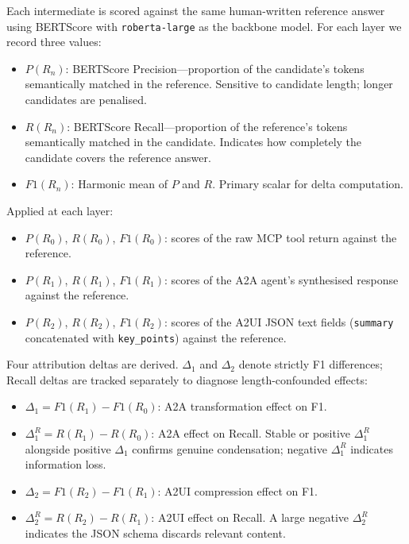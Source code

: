 \documentclass[10pt,journal,compsoc]{IEEEtran}
\begin{document}
Each intermediate is scored against the same human-written reference answer using
BERTScore with \texttt{roberta-large} as the backbone model. For each layer we
record three values:

\begin{itemize}
  \item $P(R_n)$: BERTScore Precision---proportion of the candidate's tokens
    semantically matched in the reference. Sensitive to candidate length; longer
    candidates are penalised.
  \item $R(R_n)$: BERTScore Recall---proportion of the reference's tokens
    semantically matched in the candidate. Indicates how completely the candidate
    covers the reference answer.
  \item $F1(R_n)$: Harmonic mean of $P$ and $R$. Primary scalar for delta
    computation.
\end{itemize}

Applied at each layer:

\begin{itemize}
  \item $P(R_0)$, $R(R_0)$, $F1(R_0)$: scores of the raw MCP tool return against
    the reference.
  \item $P(R_1)$, $R(R_1)$, $F1(R_1)$: scores of the A2A agent's synthesised
    response against the reference.
  \item $P(R_2)$, $R(R_2)$, $F1(R_2)$: scores of the A2UI JSON text fields
    (\texttt{summary} concatenated with \texttt{key\_points}) against the
    reference.
\end{itemize}

Four attribution deltas are derived. $\Delta_1$ and $\Delta_2$ denote strictly F1
differences; Recall deltas are tracked separately to diagnose length-confounded
effects:

\begin{itemize}
  \item $\Delta_1 = F1(R_1) - F1(R_0)$: A2A transformation effect on F1.
  \item $\Delta_1^R = R(R_1) - R(R_0)$: A2A effect on Recall. Stable or positive
    $\Delta_1^R$ alongside positive $\Delta_1$ confirms genuine condensation;
    negative $\Delta_1^R$ indicates information loss.
  \item $\Delta_2 = F1(R_2) - F1(R_1)$: A2UI compression effect on F1.
  \item $\Delta_2^R = R(R_2) - R(R_1)$: A2UI effect on Recall. A large negative
    $\Delta_2^R$ indicates the JSON schema discards relevant content.
\end{itemize}
\end{document}
